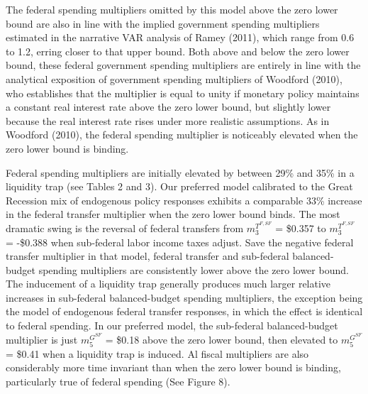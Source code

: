 \documentclass[12pt,letterpaper]{article}
\begin{document}
%

The federal spending multipliers omitted by this model above the zero lower bound are also in line with the implied government spending multipliers estimated in the narrative VAR analysis of Ramey (2011), which range from 0.6 to 1.2, erring closer to that upper bound. Both above and below the zero lower bound, these federal government spending multipliers are entirely in line with the analytical exposition of government spending multipliers of Woodford (2010), who establishes that the multiplier is  equal to unity if monetary policy maintains a constant real interest rate above the zero lower bound, but slightly lower because the real interest rate rises under more realistic assumptions. As in Woodford (2010), the federal spending multiplier is noticeably elevated when the zero lower bound is binding. 

Federal spending multipliers are initially elevated by between 29\% and 35\% in a liquidity trap (see Tables 2 and 3). Our preferred model calibrated to the Great Recession mix of endogenous policy responses exhibits a comparable 33\% increase in the federal transfer multiplier when the zero lower bound binds. The most dramatic swing is the reversal of federal transfers from $m_3^{T^{F,SF}}$ = \$0.357 to $m_3^{T^{F,SF}}$ = -\$0.388 when sub-federal labor income taxes adjust. Save the negative federal transfer multiplier in that model, federal transfer and sub-federal balanced-budget spending multipliers are consistently lower above the zero lower bound. The inducement of a liquidity trap generally produces much larger relative increases in sub-federal balanced-budget spending multipliers, the exception being the model of endogenous federal transfer responses, in which the effect is identical to federal spending. In our preferred model, the sub-federal balanced-budget multiplier is just $m_5^{G^{SF}}$ = \$0.18 above the zero lower bound, then elevated to $m_5^{G^{SF}}$ = \$0.41 when a liquidity trap is induced.  Al fiscal multipliers are also considerably more time invariant than when the zero lower bound is binding, particularly true of federal spending (See Figure 8).
\end{document}
